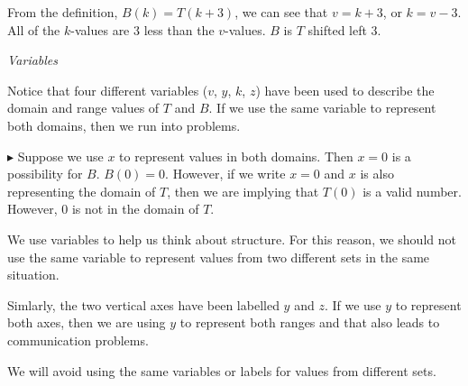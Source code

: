 \documentclass{ximera}
\begin{document}
From the definition, $B(k) = T(k+3)$, we can see that $v=k+3$, or $k=v-3$.  All of the $k$-values are $3$ less than the $v$-values.  $B$ is $T$ shifted left $3$.





\begin{warning} \textit{Variables}

Notice that four different variables ($v$, $y$, $k$, $z$) have been used to describe the domain and range values of $T$ and $B$.  If we use the same variable to represent both domains, then we run into problems.


$\blacktriangleright$ Suppose we use $x$ to represent values in both domains.  Then $x = 0$ is a possibility for $B$.  $B(0) = 0$.  However, if we write $x = 0$ and $x$ is also representing the domain of $T$, then we are implying that $T(0)$ is a valid number.  However, $0$ is not in the domain of $T$.

We use variables to help us think about structure.  For this reason, we should not use the same variable to represent values from two different sets in the same situation.


Simlarly, the two vertical axes have been labelled $y$ and $z$.  If we use $y$ to represent both axes, then we are using $y$ to represent both ranges and that also leads to communication problems.

We will avoid using the same variables or labels for values from different sets.

\end{warning}
\end{document}
